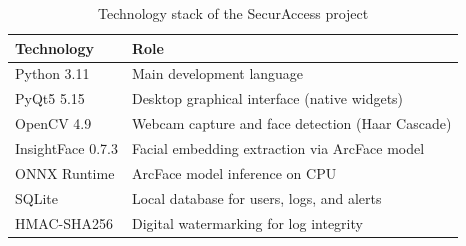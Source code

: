 \begin{table}[H]
    \centering
    \begin{tabularx}{\textwidth}{lX}
        \toprule
        \textbf{Technology} & \textbf{Role} \\
        \midrule
        Python 3.11          & Main development language \\
        PyQt5 5.15           & Desktop graphical interface (native widgets) \\
        OpenCV 4.9           & Webcam capture and face detection (Haar Cascade) \\
        InsightFace 0.7.3    & Facial embedding extraction via ArcFace model \\
        ONNX Runtime         & ArcFace model inference on CPU \\
        SQLite               & Local database for users, logs, and alerts \\
        HMAC-SHA256          & Digital watermarking for log integrity \\
        \bottomrule
    \end{tabularx}
    \caption{Technology stack of the SecurAccess project}
\end{table}
